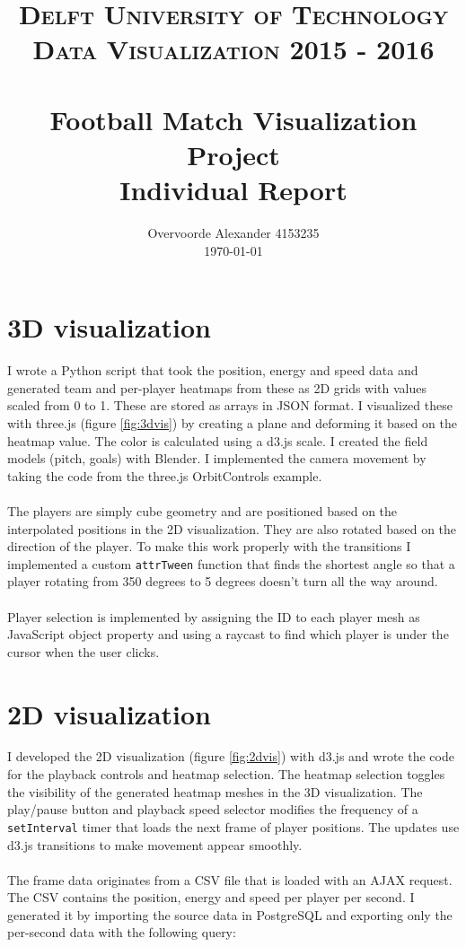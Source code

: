 \documentclass{article}
\title{ 	
		\usefont{OT1}{bch}{b}{n}
		\normalfont \normalsize \textsc{Delft University of Technology \protect\\ Data Visualization 2015 - 2016} \\ [25pt]
		\horrule{0.5pt} \\[0.4cm]
		\huge Football Match Visualization Project \\
		Individual Report
		\horrule{2pt} \\[0.5cm]
}
\author{
		\normalfont 								\normalsize
        Overvoorde Alexander 4153235\\[-3pt]		\normalsize
        \today
}
\date{}
\begin{document}
\lstset{language=sql}
\maketitle

\newpage
\section{3D visualization}

I wrote a Python script that took the position, energy and speed data and generated team and per-player heatmaps from these as 2D grids with values scaled from 0 to 1. These are stored as arrays in JSON format. I visualized these with three.js (figure \ref{fig:3dvis}) by creating a plane and deforming it based on the heatmap value. The color is calculated using a d3.js scale. I created the field models (pitch, goals) with Blender. I implemented the camera movement by taking the code from the three.js OrbitControls example.
\\ \\
The players are simply cube geometry and are positioned based on the interpolated positions in the 2D visualization. They are also rotated based on the direction of the player. To make this work properly with the transitions I implemented a custom \verb#attrTween# function that finds the shortest angle so that a player rotating from 350 degrees to 5 degrees doesn't turn all the way around.
\\ \\
Player selection is implemented by assigning the ID to each player mesh as JavaScript object property and using a raycast to find which player is under the cursor when the user clicks.

\section{2D visualization}

I developed the 2D visualization (figure \ref{fig:2dvis}) with d3.js and wrote the code for the playback controls and heatmap selection. The heatmap selection toggles the visibility of the generated heatmap meshes in the 3D visualization. The play/pause button and playback speed selector modifies the frequency of a \verb#setInterval# timer that loads the next frame of player positions. The updates use d3.js transitions to make movement appear smoothly.
\\ \\
The frame data originates from a CSV file that is loaded with an AJAX request. The CSV contains the position, energy and speed per player per second. I generated it by importing the source data in PostgreSQL and exporting only the per-second data with the following query:
\end{document}
